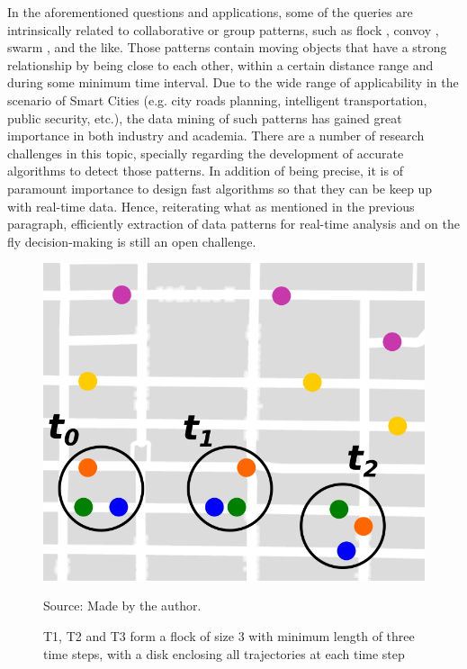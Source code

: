 In the aforementioned questions and applications, some of the queries are intrinsically related to collaborative or
group patterns, such as flock \citep{gudefficient}, convoy \citep{convoy}, swarm \citep{swarm}, and the like. Those
patterns contain moving objects that have a strong relationship by being close to each other, within a certain distance
range and during some minimum time interval. Due to the wide range of applicability in the scenario of Smart Cities
(e.g. city roads planning, intelligent transportation, public security, etc.), the data mining of such patterns has
gained great importance in both industry and academia. There are a number of research challenges in this topic,
specially regarding the development of accurate algorithms to detect those patterns. In addition of being precise, it is
of paramount importance to design fast algorithms so that they can be keep up with real-time data. Hence, reiterating
what as mentioned in the previous paragraph, efficiently extraction of data patterns for real-time analysis and on the
fly decision-making is still an open challenge.
%
%

\begin{figure}[h!]
    \centering
    \caption{T1, T2 and T3 form a flock of size 3 with minimum length of three time steps, with a disk enclosing all
        trajectories at each time step}
    \centerline{\includegraphics[width=0.7\linewidth]{images/flock_pattern.png}}
    \footnotesize{Source: Made by the author.}
    \label{fig:flocks}
\end{figure}

